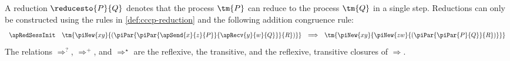 \begin{definition}[Reduction]\label{def:safeap-reduction}
  A reduction $\reducesto{P}{Q}$ denotes that the process $\tm{P}$ can reduce
  to the process $\tm{Q}$ in a single step. Reductions can only be constructed
  using the rules in \cref{def:cccp-reduction} and the following addition
  congruence rule:
  \begin{gather*}
    \begin{array}{llcll}
      \apRedSessInit
      & \tm{\piNew{xy}{(\piPar{\piPar{\apSend{x}{z}{P}}{\apRecv{y}{w}{Q}}}{R})}}
      & \Longrightarrow
      & \tm{\piNew{xy}{\piNew{zw}{(\piPar{\piPar{P}{Q}}{R})}}}
      \\
    \end{array}
  \end{gather*}
  The relations $\Longrightarrow^{?}$, $\Longrightarrow^{+}$, and
  $\Longrightarrow^\star$ are the reflexive, the transitive, and the reflexive,
  transitive closures of $\Longrightarrow$.
\end{definition}
